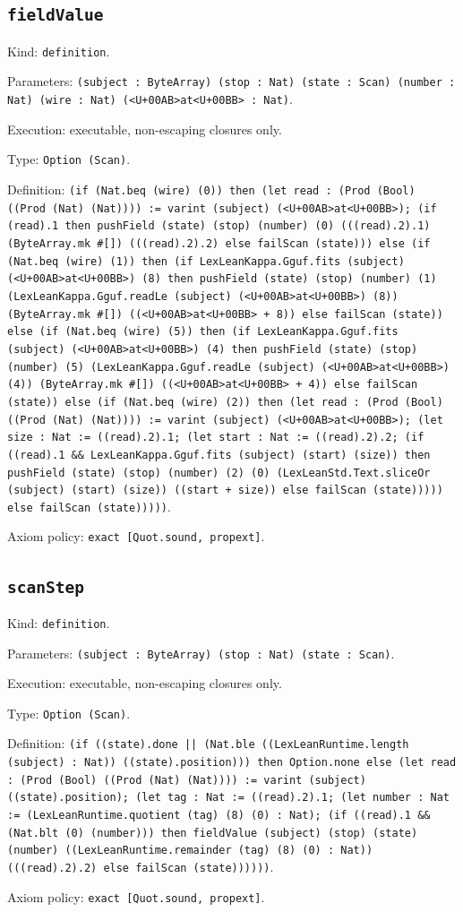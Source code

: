 \documentclass[11pt]{article}
\begin{document}
\subsection*{\texttt{fieldValue}}
\noindent Kind: \texttt{definition}.\par
\noindent Parameters: \texttt{(subject : ByteArray) (stop : Nat) (state : Scan) (number : Nat) (wire : Nat) (<U+00AB>at<U+00BB> : Nat)}.\par
\noindent Execution: executable, non-escaping closures only.\par
\noindent Type: \texttt{Option (Scan)}.\par
\noindent Definition: \texttt{(if (Nat.beq (wire) (0)) then (let read : (Prod (Bool) ((Prod (Nat) (Nat)))) := varint (subject) (<U+00AB>at<U+00BB>); (if (read).1 then pushField (state) (stop) (number) (0) (((read).2).1) (ByteArray.mk \#[]) (((read).2).2) else failScan (state))) else (if (Nat.beq (wire) (1)) then (if LexLeanKappa.Gguf.fits (subject) (<U+00AB>at<U+00BB>) (8) then pushField (state) (stop) (number) (1) (LexLeanKappa.Gguf.readLe (subject) (<U+00AB>at<U+00BB>) (8)) (ByteArray.mk \#[]) ((<U+00AB>at<U+00BB> + 8)) else failScan (state)) else (if (Nat.beq (wire) (5)) then (if LexLeanKappa.Gguf.fits (subject) (<U+00AB>at<U+00BB>) (4) then pushField (state) (stop) (number) (5) (LexLeanKappa.Gguf.readLe (subject) (<U+00AB>at<U+00BB>) (4)) (ByteArray.mk \#[]) ((<U+00AB>at<U+00BB> + 4)) else failScan (state)) else (if (Nat.beq (wire) (2)) then (let read : (Prod (Bool) ((Prod (Nat) (Nat)))) := varint (subject) (<U+00AB>at<U+00BB>); (let size : Nat := ((read).2).1; (let start : Nat := ((read).2).2; (if ((read).1 \&\& LexLeanKappa.Gguf.fits (subject) (start) (size)) then pushField (state) (stop) (number) (2) (0) (LexLeanStd.Text.sliceOr (subject) (start) (size)) ((start + size)) else failScan (state))))) else failScan (state)))))}.\par
\noindent Axiom policy: \texttt{exact [Quot.sound, propext]}.\par
\subsection*{\texttt{scanStep}}
\noindent Kind: \texttt{definition}.\par
\noindent Parameters: \texttt{(subject : ByteArray) (stop : Nat) (state : Scan)}.\par
\noindent Execution: executable, non-escaping closures only.\par
\noindent Type: \texttt{Option (Scan)}.\par
\noindent Definition: \texttt{(if ((state).done || (Nat.ble ((LexLeanRuntime.length (subject) : Nat)) ((state).position))) then Option.none else (let read : (Prod (Bool) ((Prod (Nat) (Nat)))) := varint (subject) ((state).position); (let tag : Nat := ((read).2).1; (let number : Nat := (LexLeanRuntime.quotient (tag) (8) (0) : Nat); (if ((read).1 \&\& (Nat.blt (0) (number))) then fieldValue (subject) (stop) (state) (number) ((LexLeanRuntime.remainder (tag) (8) (0) : Nat)) (((read).2).2) else failScan (state))))))}.\par
\noindent Axiom policy: \texttt{exact [Quot.sound, propext]}.\par
\end{document}
